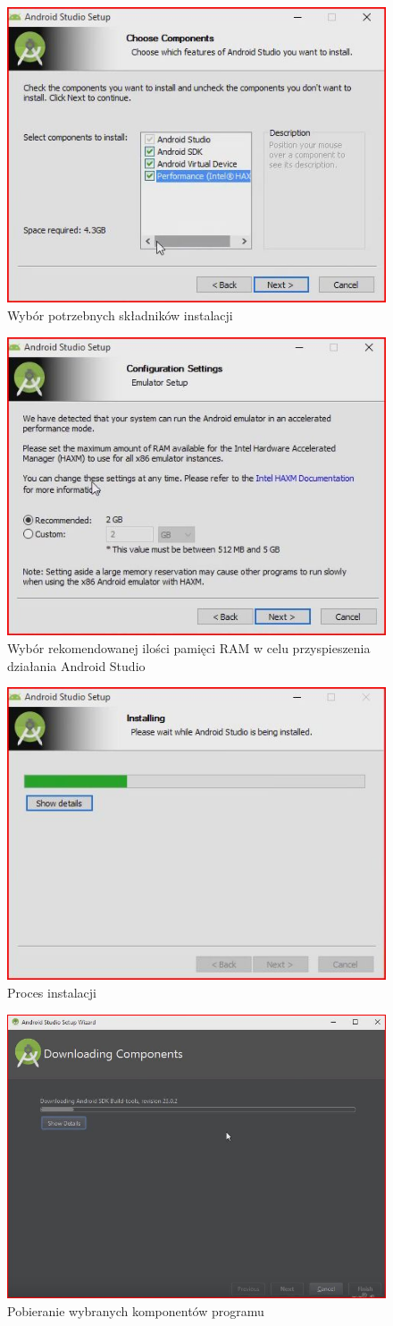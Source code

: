 \begin{figure}[h!]
\centering
\includegraphics[width=0.5\linewidth]{fig/i2}
\caption{Wybór potrzebnych składników instalacji}
\label{fig:12}
\end{figure}

\begin{figure}[h!]
\centering
\includegraphics[width=0.5\linewidth]{fig/i3}
\caption{Wybór rekomendowanej ilości pamięci RAM w celu przyspieszenia działania Android Studio}
\label{fig:13}
\end{figure}

\begin{figure}[h!]
\centering
\includegraphics[width=0.5\linewidth]{fig/i4}
\caption{Proces instalacji}
\label{fig:14}
\end{figure}

\begin{figure}[h!]
\centering
\includegraphics[width=0.5\linewidth]{fig/i5}
\caption{Pobieranie wybranych komponentów programu}
\label{fig:15}
\end{figure}

